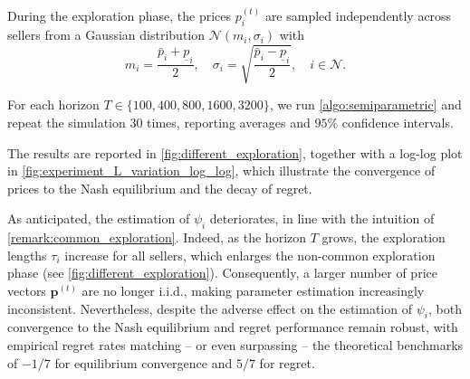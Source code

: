 \documentclass{article} %
\begin{document}
During the exploration phase, the prices $p_i^{(t)}$ are sampled independently across sellers from a Gaussian distribution $\mathcal{N}(m_i, \sigma_i)$ with
\[
m_i = \frac{\bar{p}_i + \underline{p}_i}{2}, 
\quad 
\sigma_i = \sqrt{\frac{\bar{p}_i - \underline{p}_i}{2}}, 
\quad i \in \mathcal{N}.
\]

For each horizon $T \in \{100, 400, 800, 1600, 3200\}$, we run \cref{algo:semiparametric} and repeat the simulation 30 times, reporting averages and $95\%$ confidence intervals.

The results are reported in \cref{fig:different_exploration}, together with a log-log plot in \cref{fig:experiment_L_variation_log_log}, which illustrate the convergence of prices to the Nash equilibrium and the decay of regret.  

As anticipated, the estimation of $\psi_i$ deteriorates, in line with the intuition of \cref{remark:common_exploration}. Indeed, as the horizon $T$ grows, the exploration lengths $\tau_i$ increase for all sellers, which enlarges the non-common exploration phase (see \cref{fig:different_exploration}). Consequently, a larger number of price vectors $\mathbf{p}^{(t)}$ are no longer i.i.d., making parameter estimation increasingly inconsistent. Nevertheless, despite the adverse effect on the estimation of $\psi_i$, both convergence to the Nash equilibrium and regret performance remain robust, with empirical regret rates matching -- or even surpassing -- the theoretical benchmarks of $-1/7$ for equilibrium convergence and $5/7$ for regret.



\end{document}

